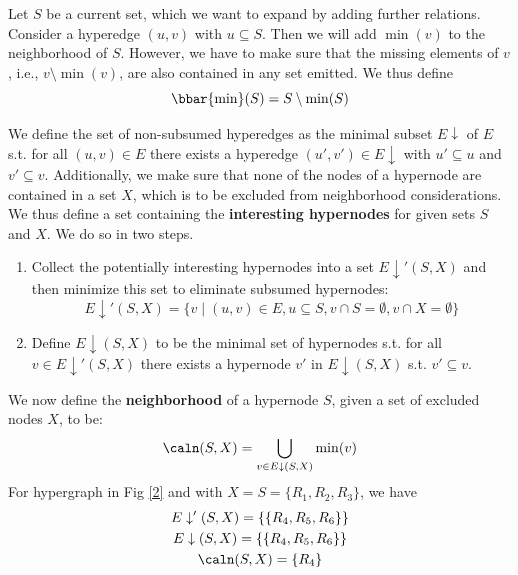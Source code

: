\documentclass[11pt]{article}
\begin{document}
Let \(S\) be a current set, which we want to expand by adding further relations. Consider a hyperedge
\((u,v)\) with \(u\subseteq S\). Then we will add \(\min(v)\) to the neighborhood of \(S\). However,
we have to make sure that the missing elements of \(v\), i.e., \(v\setminus\min(v)\), are also
contained in any set emitted. We thus define
\begin{equation*}
\bbar{\min}(S)=S\setminus \min(S)
\end{equation*}

We define the set of non-subsumed hyperedges as the minimal subset \(E\downarrow\) of \(E\) s.t. for
all \((u,v)\in E\) there exists a hyperedge \((u',v')\in E\downarrow\) with \(u'\subseteq u\) and
\(v'\subseteq v\). Additionally, we make sure that none of the nodes of a hypernode are contained in a
set \(X\), which is to be excluded from neighborhood considerations. We thus define a set containing
the \textbf{interesting hypernodes} for given sets \(S\) and \(X\). We do so in two steps.
\begin{enumerate}
\item Collect the potentially interesting hypernodes into a set \(E\downarrow'(S,X)\) and then minimize
this set to eliminate subsumed hypernodes:
\begin{equation*}
E\downarrow'(S,X)=\{v\mid (u,v)\in E,u\subseteq S,v\cap S=\emptyset,v\cap X=\emptyset\}
\end{equation*}
\item Define \(E\downarrow(S,X)\) to be the minimal set of hypernodes s.t. for all
\(v\in E\downarrow'(S,X)\) there exists a hypernode \(v'\) in \(E\downarrow(S,X)\) s.t.
\(v'\subseteq v\).
\end{enumerate}



We now define the \textbf{neighborhood} of a hypernode \(S\), given a set of excluded nodes \(X\), to be:
\begin{equation*}
\caln(S,X)=\bigcup_{v\in E\downarrow(S,X)}\min(v)
\end{equation*}
For hypergraph in Fig \ref{2} and with \(X=S=\{R_1,R_2,R_3\}\), we have
\begin{gather*}
E\downarrow'(S,X)=\{\{R_4,R_5,R_6\}\}\\
E\downarrow(S,X)=\{\{R_4,R_5,R_6\}\}\\
\caln(S,X)=\{R_4\}
\end{gather*}
\end{document}
